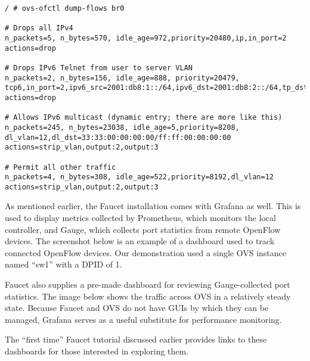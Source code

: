 \begin{verbatim}
/ # ovs-ofctl dump-flows br0

# Drops all IPv4
n_packets=5, n_bytes=570, idle_age=972,priority=20480,ip,in_port=2
actions=drop

# Drops IPv6 Telnet from user to server VLAN
n_packets=2, n_bytes=156, idle_age=888, priority=20479,
tcp6,in_port=2,ipv6_src=2001:db8:1::/64,ipv6_dst=2001:db8:2::/64,tp_dst=23
actions=drop

# Allows IPv6 multicast (dynamic entry; there are more like this)
n_packets=245, n_bytes=23038, idle_age=5,priority=8208,
dl_vlan=12,dl_dst=33:33:00:00:00:00/ff:ff:00:00:00:00
actions=strip_vlan,output:2,output:3

# Permit all other traffic
n_packets=4, n_bytes=308, idle_age=522,priority=8192,dl_vlan=12
actions=strip_vlan,output:2,output:3
\end{verbatim}

As mentioned earlier, the Faucet installation comes with Grafana as well.
This is used to display metrics collected by Prometheus, which monitors
the local controller, and Gauge, which collects port statistics from
remote OpenFlow devices. The screenshot below is an example of a
dashboard used to track connected OpenFlow devices. Our demonstration
used a single OVS instance named ``sw1'' with a DPID of 1.


Faucet also supplies a pre-made dashboard for reviewing Gauge-collected
port statistics. The image below shows the traffic across OVS in a relatively
steady state. Because Faucet and OVS do not have GUIs by which they can
be managed, Grafana serves as a useful substitute for performance monitoring.


The ``first time'' Faucet tutorial discussed earlier provides links to these
dashboards for those interested in exploring them.
